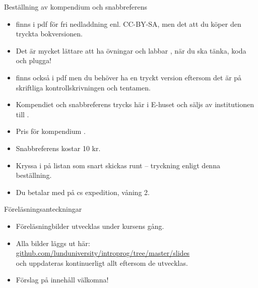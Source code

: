\else


\begin{Slide}{Beställning av kompendium och snabbreferens}\SlideFontSmall
\begin{itemize}

\item {} finns i pdf för fri nedladdning enl. CC-BY-SA, men det  att du köper den tryckta bokversionen.

\item Det är mycket lättare att ha övningar och labbar  , när du ska tänka, koda och plugga!

\item {} finns också i pdf men du behöver ha en tryckt version eftersom det är  på skriftliga kontrollskrivningen och tentamen.

\item Kompendiet och snabbreferens trycks här i E-huset och säljs av institutionen till .

\item Pris för kompendium .

\item Snabbreferens kostar 10 kr.

\item Kryssa i  på listan som snart skickas runt -- tryckning enligt denna beställning.

\item Du betalar  med  på cs expedition, våning 2.

\end{itemize}
\end{Slide}

\begin{Slide}{Föreläsningsanteckningar}
\begin{itemize}
\item Föreläsningbilder utvecklas under kursens gång.
\item Alla bilder läggs ut här: \\
\href{https://github.com/lunduniversity/introprog/tree/master/slides}{github.com/lunduniversity/introprog/tree/master/slides} \\
och uppdateras kontinuerligt allt eftersom de utvecklas.
\item Förslag på innehåll välkomna!
\end{itemize}
\end{Slide}
\fi

